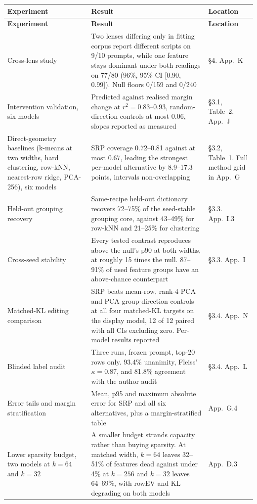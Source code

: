 \documentclass[11pt]{article}
\begin{document}
\begingroup
\small
\setlength{\tabcolsep}{4pt}
\renewcommand{\arraystretch}{1.15}
\begin{longtable}{@{}p{}p{}p{}@{}}
\toprule
\textbf{Experiment} & \textbf{Result} & \textbf{Location} \\
\midrule
\endfirsthead
\toprule
\textbf{Experiment} & \textbf{Result} & \textbf{Location} \\
\midrule
\endhead
\bottomrule
\endfoot

Cross-lens study
& Two lenses differing only in fitting corpus report different scripts on
9/10 prompts, while one feature stays dominant under both readings on 77/80
(96\%, 95\% CI [0.90, 0.99]). Null floors 0/159 and 0/240
& \S4. App.~K \\

Intervention validation, six models
& Predicted against realised margin change at $r^2=0.83$--$0.93$,
random-direction controls at most 0.06, slopes reported as measured
& \S3.1, Table~2. App.~J \\

Direct-geometry baselines (k-means at two widths, hard clustering, row-kNN,
nearest-row ridge, PCA-256), six models
& SRP coverage 0.72--0.81 against at most 0.67, leading the strongest
per-model alternative by 8.9--17.3 points, intervals non-overlapping
& \S3.2, Table~1. Full method grid in App.~G \\

Held-out grouping recovery
& Same-recipe held-out dictionary recovers 72--75\% of the seed-stable
grouping core, against 43--49\% for row-kNN and 21--25\% for clustering
& \S3.3. App.~I.3 \\

Cross-seed stability
& Every tested contrast reproduces above the null's p90 at both widths, at
roughly 15 times the null. 87--91\% of used feature groups have an
above-chance counterpart
& \S3.3. App.~I \\

Matched-KL editing comparison
& SRP beats mean-row, rank-4 PCA and PCA group-direction controls at all four
matched-KL targets on the display model, 12 of 12 paired with all CIs
excluding zero. Per-model results reported
& \S3.4. App.~N \\

Blinded label audit
& Three runs, frozen prompt, top-20 rows only. 93.4\% unanimity, Fleiss'
$\kappa=0.87$, and 81.8\% agreement with the author audit
& \S3.4. App.~L \\

Error tails and margin stratification
& Mean, p95 and maximum absolute error for SRP and all six alternatives, plus
a margin-stratified table
& App.~G.4 \\

Lower sparsity budget, two models at $k=64$ and $k=32$
& A smaller budget strands capacity rather than buying sparsity. At matched
width, $k=64$ leaves 32--51\% of features dead against under 4\% at $k=256$
and $k=32$ leaves 64--69\%, with rowEV and KL degrading on both models
& App.~D.3 \\
\end{longtable}
\endgroup
\end{document}
